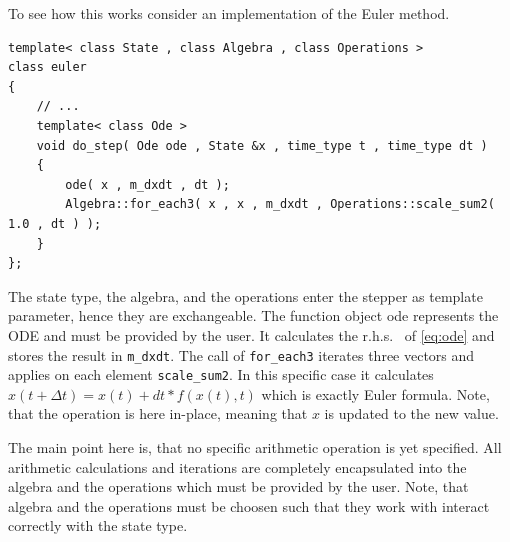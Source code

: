 \documentclass[1p]{elsarticle}
\newcommand{\code}[1]{\lstinline|#1|}
\begin{document}
To see how this works consider an implementation of the Euler method.
\begin{lstlisting}
template< class State , class Algebra , class Operations >
class euler
{
    // ...
    template< class Ode >
    void do_step( Ode ode , State &x , time_type t , time_type dt )
    {
        ode( x , m_dxdt , dt );
        Algebra::for_each3( x , x , m_dxdt , Operations::scale_sum2( 1.0 , dt ) );
    }
};
\end{lstlisting}
The state type, the algebra, and the operations enter the stepper as
template parameter, hence they are exchangeable. The function object
ode represents the ODE and must be provided by the user. It calculates
the r.h.s.~ of \eqref{eq:ode} and stores the result in
\code{m_dxdt}. The call of \code{for_each3} iterates three vectors and
applies on each element \code{scale_sum2}. In this specific case it
calculates $x(t+\Delta t) = x(t) + dt * f(x(t) , t)$ which is exactly
Euler formula. Note, that the operation is here in-place, meaning that
$x$ is updated to the new value.

The main point here is, that no specific arithmetic operation is yet
specified. All arithmetic calculations and iterations are completely
encapsulated into the algebra and the operations which must be
provided by the user. Note, that algebra and the operations must be
choosen such that they work with interact correctly with the state
type.


\end{document}
